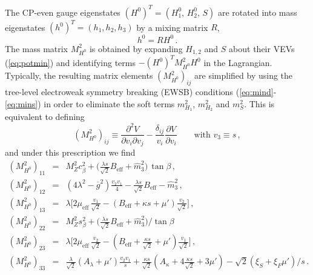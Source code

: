 \documentclass[final,3p,times]{elsarticle}
\newcommand{\be}{\begin{equation}}
\newcommand{\ee}{\end{equation}}
\newcommand{\ba}{\begin{eqnarray}}
\newcommand{\ea}{\end{eqnarray}}
\newcommand{\ds}{\displaystyle}
\begin{document}
The CP-even gauge eigenstates $(H^0)^T = (H_1^0,\, H_2^0, \, S)$ are rotated into
 mass eigenstates $(h^0)^T = (h_1, h_2, h_3)$ by a mixing matrix $R$,
%
\be 
h^0 = R H^0\,. 
\ee 
%
The mass matrix $M^2_{H^0}$ is obtained by expanding $H_{1,2}$ and $S$ about their 
VEVs (\ref{eq:potmin}) and identifying terms $-(H^0)^T M^2_{H^0} H^0$ in the Lagrangian.  
Typically, the resulting matrix elements $(M_{H^0}^2)_{ij}$ are simplified by using the 
tree-level electroweak symmetry breaking (EWSB) conditions (\ref{eq:mind}-\ref{eq:mins}) 
in order to eliminate the soft terms $m_{H_1}^2$, $m_{H_2}^2$ and $m_S^2$.  This is 
equivalent to defining  
%
\be
(M_{H^0}^2)_{ij} \equiv  \ds\frac{\partial^2 V}{\partial v_i \partial v_j} 
- \ds\frac{\delta_{ij}}{v_i}\ds\frac{\partial V}{\partial v_i} \qquad \mbox{with } v_3\equiv s\,,
\ee
%
and under this prescription we find    
%
\ba
 (M_{H^0}^2)_{11} & = & M_Z^2 c_\beta^2 
 + \Bigg(\ds\frac{\lambda s}{\sqrt{2}} B_\textrm{eff} +
 \widehat{m}_3^2\Bigg)\,\tan\beta\,,\\
 (M_{H^0}^2)_{12} & = & (4\lambda^2 - \overline{g}^2) \ds\frac{v_2 v_1 }{4}- 
 \ds\frac{\lambda s}{\sqrt{2}} B_\textrm{eff} - \widehat{m}_3^2\,, \\ 
 (M_{H^0}^2)_{13} & = & \lambda \Bigg[2 \mu_\textrm{eff}\,\ds\frac{ v_1}{\sqrt{2}} -
 (B_\textrm{eff} + \kappa s + \mu')\ds\frac{ v_2}{\sqrt{2}}\Bigg]\,,\\
 (M_{H^0}^2)_{22} & = & M_Z^2 s_\beta^2 + \Bigg(\ds\frac{\lambda s}{\sqrt{2}} B_\textrm{eff} +
\widehat{m}_3^2\Bigg)/\tan\beta\, \\
 (M_{H^0}^2)_{23} & = & \lambda \Bigg[2 \mu_\textrm{eff}\, \ds\frac{ v_2}{\sqrt{2}} -
(B_\textrm{eff} + \frac{\kappa s}{\sqrt{2}} + \mu')\ds\frac{ v_1}{\sqrt{2}}\Bigg]\,, \\
 (M_{H^0}^2)_{33} & = & \ds\frac{\lambda}{\sqrt{2}} (A_\lambda + \mu') \frac{v_2 v_1}{s}
+ \frac{\kappa s}{\sqrt{2}} (A_\kappa + 4\frac{\kappa s}{\sqrt{2}}+ 3 \mu') - \sqrt{2}(\xi_S + \xi_F \mu')/s\,.
\label{eq:MH0}
\ea
\end{document}
